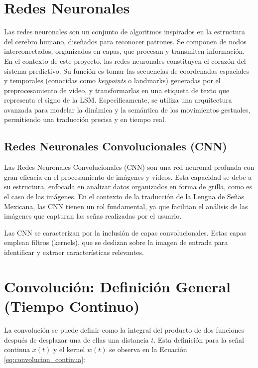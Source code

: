 \section{Redes Neuronales}
Las redes neuronales son un conjunto de algoritmos inspirados en la estructura del cerebro humano, diseñados para reconocer patrones. Se componen de nodos interconectados, organizados en capas, que procesan y transmiten información.
En el contexto de este proyecto, las redes neuronales constituyen el corazón del sistema predictivo. Su función es tomar las secuencias de coordenadas espaciales y temporales (conocidas como \textit{keypoints} o landmarks) generadas por el preprocesamiento de video, y transformarlas en una etiqueta de texto que representa el signo de la LSM. Específicamente, se utiliza una arquitectura avanzada para modelar la dinámica y la semántica de los movimientos gestuales, permitiendo una traducción precisa y en tiempo real.
\subsection{Redes Neuronales Convolucionales (CNN)}

Las Redes Neuronales Convolucionales (CNN) son una red neuronal profunda con gran eficacia en el procesamiento de imágenes y videos. Esta capacidad se debe a su estructura, enfocada en analizar datos organizados en forma de grilla, como es el caso de las imágenes. En el contexto de la traducción de la Lengua de Señas Mexicana, las CNN tienen un rol fundamental, ya que facilitan el análisis de las imágenes que capturan las señas realizadas por el usuario.

Las CNN se caracterizan por la inclusión de capas convolucionales. Estas capas emplean filtros (kernels), que se deslizan sobre la imagen de entrada para identificar y extraer características relevantes.

\section{Convolución: Definición General (Tiempo Continuo)}

La convolución se puede definir como la integral del producto de dos funciones después de desplazar una de ellas una distancia $t$. Esta definición para la señal continua $x(t)$ y el kernel $w(t)$ se observa en la Ecuación \ref{eq:convolucion_continua}:


